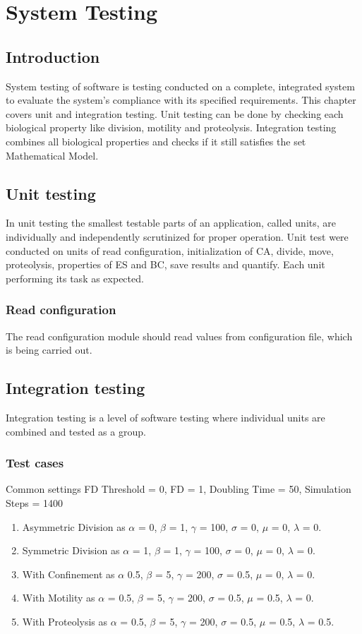 \chapter{System Testing}

\section{Introduction}
System testing of software is testing conducted on a complete, integrated system to evaluate the system's compliance with its specified requirements. 
This chapter covers unit and integration testing.
Unit testing can be done by checking each biological property like division, motility and proteolysis.
Integration testing combines all biological properties and checks if it still satisfies the set Mathematical Model.

\section{Unit testing}
In unit testing the smallest testable parts of an application, called units, are individually and independently scrutinized for proper operation. 
Unit test were conducted on units of read configuration, initialization of CA, divide, move, proteolysis, properties of ES and BC, save results and quantify.
Each unit performing its task as expected.

\subsection{Read configuration}
The read configuration module should read values from configuration file, which is being carried out.

\section{Integration testing}
Integration testing is a level of software testing where individual units are combined and tested as a group.

\subsection{Test cases}
Common settings FD Threshold = 0, FD = 1, Doubling Time = 50, Simulation Steps = 1400
\begin{enumerate}
\label{testCases}
 \item Asymmetric Division as $\alpha$ = 0, $\beta$ = 1, $\gamma$ = 100, $\sigma$ = 0, $\mu$ = 0, $\lambda$ = 0. 
 \item Symmetric Division as $\alpha$ = 1, $\beta$ = 1, $\gamma$ = 100, $\sigma$ = 0, $\mu$ = 0, $\lambda$ = 0. 
 \item With Confinement as $\alpha$ 0.5, $\beta$ = 5, $\gamma$ = 200, $\sigma$ = 0.5, $\mu$ = 0, $\lambda$ = 0. 
 \item With Motility as $\alpha$ = 0.5, $\beta$ = 5, $\gamma$ = 200, $\sigma$ = 0.5, $\mu$ = 0.5, $\lambda$ = 0. 
 \item With Proteolysis as $\alpha$ = 0.5, $\beta$ = 5, $\gamma$ = 200, $\sigma$ = 0.5, $\mu$ = 0.5, $\lambda$ = 0.5. 
\end{enumerate}

